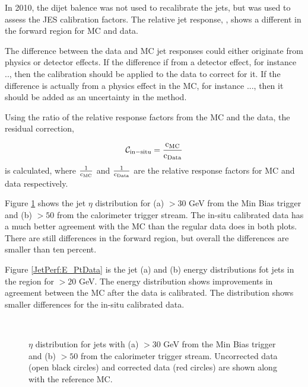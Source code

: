 In 2010, the dijet \pt{} balence was not used to recalibrate the jets, but was used to assess the JES calibration factors.
The relative jet response, \cite{ref:EtaInter2010}, shows a different in the forward region for MC and data.

The difference between the data and MC jet responses could either originate from physics or detector effects. 
If the difference if from a detector effect, for instance .., then the calibration should be applied to the data to correct for it.
If the difference is actually from a physics effect in the MC, for instance ..., then it should be added as an uncertainty in the method.



Using the ratio of the relative response factors from the MC and the data, the residual correction, 

\begin{equation}
\mathcal{C_{\rm{in-situ}}} = \frac{\rm{c_{MC}}}{\rm{c_{Data}}}
\label{JetPerf:ResidualCorrection}
\end{equation}
is calculated, where $\frac{1}{\rm{c_{MC}}}$ and $\frac{1}{\rm{c_{Data}}}$ are the relative response factors for MC and data respectively. 


Figure \ref{JetPerf:EtaData} shows the jet $\eta$ distribution for (a) \pt{}$>30$ GeV from the Min Bias trigger and (b) \pt{}$>50$ from the calorimeter trigger stream. 
The in-situ calibrated data has a much better agreement with the MC than the regular data does in both plots. 
There are still differences in the forward region, but overall the differences are smaller than ten percent.

Figure \ref{JetPerf:E_PtData} is the jet (a) \pt{}  and  (b) energy distributions  fot jets in the region   for \pt{}$>20$ GeV. 
The energy distribution shows improvements in agreement between the MC after the data is calibrated.
The \pt{} distribution shows smaller differences for the in-situ calibrated data.



\begin{figure}
\centering
\mbox{
              \quad
              \quad
}
\caption[]{
$\eta$ distribution for jets with (a) \pt{}$>30$ GeV from the Min Bias trigger and (b) \pt{}$>50$ from the calorimeter trigger stream. 
Uncorrected data (open black circles) and corrected data (red circles) are shown along with the reference MC. 
\label{JetPerf:EtaData}}
\end{figure}

